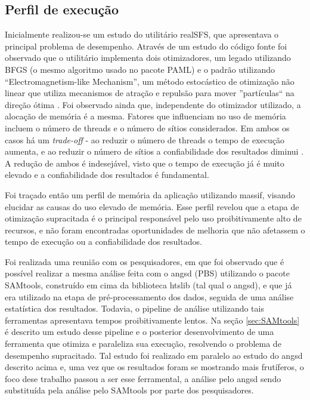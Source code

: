 \documentclass[cic,tc]{iiufrgs}
\begin{document}
\subsection{Perfil de execução}

Inicialmente realizou-se um estudo do utilitário realSFS, que apresentava o
principal problema de desempenho. Através de um estudo do código fonte foi
observado que o utilitário implementa dois otimizadores, um legado utilizando
BFGS (o mesmo algoritmo usado no pacote PAML) e o padrão utilizando
``Electromagnetism-like Mechanism'', um método estocástico de otimização
não linear que utiliza mecanismos de atração e repulsão para mover
''partículas`` na direção ótima \cite{5636954}. Foi observado ainda que,
independente do otimizador utilizado, a alocação de memória é a mesma. Fatores
que influenciam no uso de memória incluem o número de threads e o número de
sítios considerados. Em ambos os casos há um \textit{trade-off} - ao reduzir o
número de threads o tempo de execução aumenta, e ao reduzir o número de sítios
a confiabilidade dos resultados diminui \cite{popgen2016angsd}. A redução de
ambos é indesejável, visto que o tempo de execução já é muito elevado e a
confiabilidade dos resultados é fundamental.

Foi traçado então um perfil de memória da aplicação utilizando massif,
visando elucidar as causas do uso elevado de memória. Esse perfil revelou que a
etapa de otimização supracitada é o principal responsável pelo uso
proibitivamente alto de recursos, e não foram encontradas oportunidades de
melhoria que não afetassem o tempo de execução ou a confiabilidade dos
resultados.

Foi realizada uma reunião com os pesquisadores, em que foi observado que é
possível realizar a mesma análise feita com o angsd (PBS) utilizando o pacote
SAMtools, construído em cima da biblioteca htslib (tal qual o angsd), e que já
era utilizado na etapa de pré-processamento dos dados, seguida de uma análise
estatística dos resultados. Todavia, o pipeline de análise utilizando tais
ferramentas apresentava tempos proibitivamente lentos. Na seção
\ref{sec:SAMtools} é descrito um estudo desse pipeline e o posterior
desenvolvimento de uma ferramenta que otimiza e paraleliza sua execução,
resolvendo o problema de desempenho supracitado. Tal estudo foi realizado em
paralelo ao estudo do angsd descrito acima e, uma vez que os resultados foram
se mostrando mais frutíferos, o foco dese trabalho passou a ser esse
ferramental, a análise pelo angsd sendo substituída pela análise pelo SAMtools
por parte dos pesquisadores.
\end{document}
